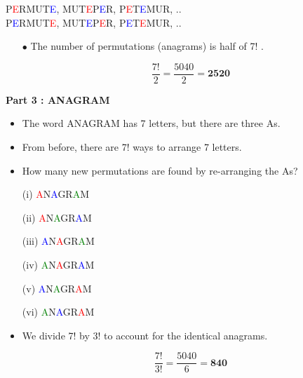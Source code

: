 \begin{center}
	P\textcolor{red}{E}RMUT\textcolor{blue}{E}, \; MUT\textcolor{red}{E}P\textcolor{blue}{E}R, \; P\textcolor{red}{E}T\textcolor{blue}{E}MUR,\; ..\\
	P\textcolor{blue}{E}RMUT\textcolor{red}{E}, \; MUT\textcolor{blue}{E}P\textcolor{red}{E}R, \; P\textcolor{blue}{E}T\textcolor{red}{E}MUR,\; ..
\end{center}


\begin{itemize}
	\item[$\bullet$]  The number of permutations (anagrams) is half of 7! .
	
	\[\frac{7!}{2} =  \frac{5040}{2} = \boldsymbol{2520} \]
\end{itemize}


\textbf{Part 3 : ANAGRAM}\\
\begin{itemize}
	\item The word ANAGRAM has 7 letters, but there are three As.
	\item From before, there are 7! ways to arrange 7 letters.
	\item How many new permutations are found by re-arranging the As?
\end{itemize}

\begin{multicols}{2}
	\begin{itemize}
		\item[(i)]	\textcolor{red}{A}N\textcolor{blue}{A}GR\textcolor{green}{A}M 
		\item[(ii)]		\textcolor{red}{A}N\textcolor{green}{A}GR\textcolor{blue}{A}M 
		\item[(iii)] 		\textcolor{blue}{A}N\textcolor{red}{A}GR\textcolor{green}{A}M  
		\item[(iv)]		\textcolor{green}{A}N\textcolor{red}{A}GR\textcolor{blue}{A}M 
		\item[(v)]	\textcolor{blue}{A}N\textcolor{green}{A}GR\textcolor{red}{A}M 
		\item[(vi)]		\textcolor{green}{A}N\textcolor{blue}{A}GR\textcolor{red}{A}M 
	\end{itemize}
\end{multicols}

\begin{itemize}
	\item We divide 7! by 3! to account for the identical anagrams.
	
	\[\frac{7!}{3!} =  \frac{5040}{6} = \boldsymbol{840} \]
\end{itemize}

